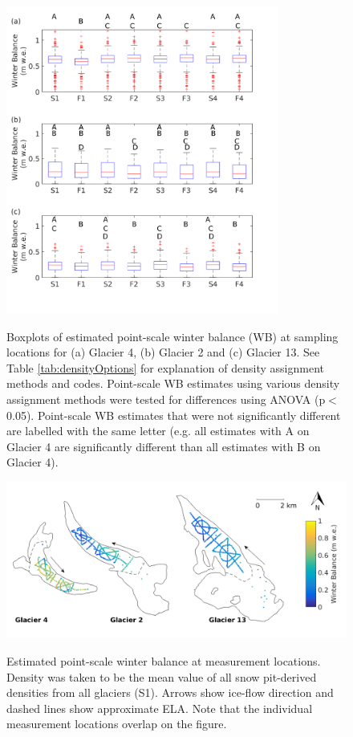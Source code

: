 \documentclass{sfuthesis}
\begin{document}
\begin{figure}[H]
	\centering
	\includegraphics[width = 0.8\textwidth]{AllSWEopts_boxplot.png}\\
	\caption{Boxplots of estimated point-scale winter balance (WB) at sampling locations for (a) Glacier 4, (b) Glacier 2 and (c) Glacier 13. See Table \ref{tab:densityOptions} for explanation of density assignment methods and codes. Point-scale WB estimates using various density assignment methods were tested for differences using ANOVA (p$<$0.05). Point-scale WB estimates that were not significantly different are labelled with the same letter (e.g. all estimates with A on Glacier 4 are significantly different than all estimates with B on Glacier 4).}
	\label{fig:AllSWEopts_boxplot}
\end{figure}


\begin{figure}[H]
	\centering
	\includegraphics[width = \textwidth]{SWEmap_opt2.png}\\
	\caption{Estimated point-scale winter balance at measurement locations. Density was taken to be the mean value of all snow pit-derived densities from all glaciers (S1). Arrows show ice-flow direction and dashed lines show approximate ELA. Note that the individual measurement locations overlap on the figure.}
	\label{fig:SWEmap_S1}
\end{figure}
\end{document}
